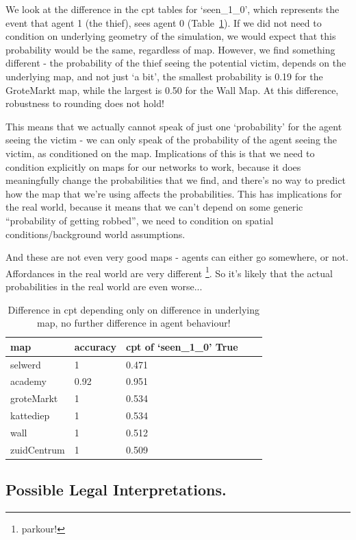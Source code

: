 We look at the difference in the cpt tables for `seen\_1\_0', which represents the event that agent 1 (the thief), sees agent 0 (Table~\ref{mapstab}). If we did not need to condition on underlying geometry of the simulation, we would expect that this probability would be the same, regardless of map. However, we find something different - the probability of the thief seeing the potential victim, depends on the underlying map, and not just `a bit', the smallest probability is 0.19 for the GroteMarkt map, while the largest is 0.50 for the Wall Map. At this difference, robustness to rounding does not hold!

This means that we actually cannot speak of just one `probability' for the agent seeing the victim - we can only speak of the probability of the agent seeing the victim, as conditioned on the map. Implications of this is that we need to condition explicitly on maps for our networks to work, because it does meaningfully change the probabilities that we find, and there's no way to predict how the map that we're using affects the probabilities. This has implications for the real world, because it means that we can't depend on some generic ``probability of getting robbed'', we need to condition on spatial conditions/background world assumptions.

And these are not even very good maps - agents can either go somewhere, or not. Affordances in the real world are very different \footnote{parkour!}. So it's likely that the actual probabilities in the real world are even worse...



\begin{table}[]
\begin{tabular}{lllll}
map & accuracy & cpt of `seen\_1\_0' True \\
\hline
selwerd& 1 & 0.471\\
academy & 0.92 & 0.951\\
groteMarkt & 1 & 0.534\\
kattediep & 1 & 0.534\\
wall & 1 & 0.512\\
zuidCentrum &1 & 0.509\\
\end{tabular}
\caption{Difference in cpt depending only on difference in underlying map, no further difference in agent behaviour!}
\label{mapstab}
\end{table}


\subsection{Possible Legal Interpretations.}




